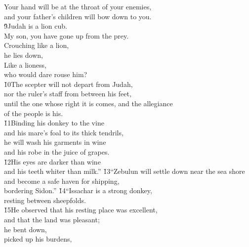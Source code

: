 \begin{poetry}
\poemll    Your hand will be at the throat of your enemies, \\
\poeml and your father's children will bow down to you. \\
\poeml \v{9}Judah is a lion cub. \\
\poemll    My son, you have gone up from the prey. \\
\poeml Crouching like a lion, \\
\poemll    he lies down, \\
\poeml Like a lioness, \\
\poemll    who would dare rouse him? \\
\poeml \v{10}The scepter will not depart from Judah, \\
\poemll    nor the ruler's staff from between his feet, \\
\poeml until the one whose right it is comes, and the allegiance \\
\poemll    of the people is his. \\
\poeml \v{11}Binding his donkey to the vine \\
\poemll    and his mare's foal to its thick tendrils, \\
\poeml he will wash his garments in wine \\
\poemll    and his robe in the juice of grapes. \\
\poeml \v{12}His eyes are darker than wine \\
\poemll    and his teeth whiter than milk.''
\poeml \v{13}``Zebulun will settle down near the sea shore \\
\poemll    and become a safe haven for shipping, \\
\poemlll       bordering Sidon.''
\poeml \v{14}``Issachar is a strong donkey, \\
\poemll    resting between sheepfolds. \\
\poeml \v{15}He observed that his resting place was excellent, \\
\poemll    and that the land was pleasant; \\
\poeml he bent down, \\
\poemll    picked up his burdens, \\

\end{poetry}
